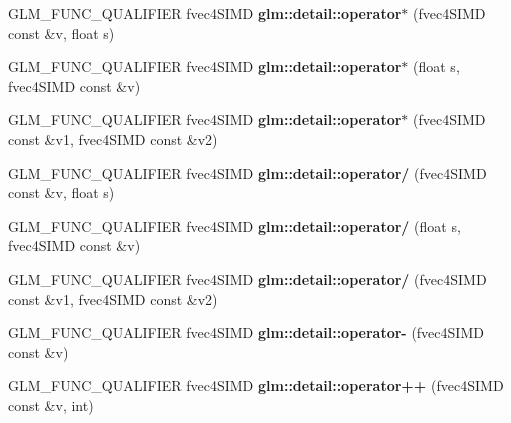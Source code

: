 \begin{DoxyCompactItemize}
\item 
\mbox{\label{simd__vec4_8inl_a640fd1bfb152eec121c97429854496cf}} 
G\+L\+M\+\_\+\+F\+U\+N\+C\+\_\+\+Q\+U\+A\+L\+I\+F\+I\+ER fvec4\+S\+I\+MD {\bfseries glm\+::detail\+::operator$\ast$} (fvec4\+S\+I\+MD const \&v, float s)
\item 
\mbox{\label{simd__vec4_8inl_a00cbd7d01eca0724ee68cdf04fa55d62}} 
G\+L\+M\+\_\+\+F\+U\+N\+C\+\_\+\+Q\+U\+A\+L\+I\+F\+I\+ER fvec4\+S\+I\+MD {\bfseries glm\+::detail\+::operator$\ast$} (float s, fvec4\+S\+I\+MD const \&v)
\item 
\mbox{\label{simd__vec4_8inl_ae683c4041ea23fddf34c36b87cbbd319}} 
G\+L\+M\+\_\+\+F\+U\+N\+C\+\_\+\+Q\+U\+A\+L\+I\+F\+I\+ER fvec4\+S\+I\+MD {\bfseries glm\+::detail\+::operator$\ast$} (fvec4\+S\+I\+MD const \&v1, fvec4\+S\+I\+MD const \&v2)
\item 
\mbox{\label{simd__vec4_8inl_af8a63b3b0eb2a7c3f59120bb4e160a76}} 
G\+L\+M\+\_\+\+F\+U\+N\+C\+\_\+\+Q\+U\+A\+L\+I\+F\+I\+ER fvec4\+S\+I\+MD {\bfseries glm\+::detail\+::operator/} (fvec4\+S\+I\+MD const \&v, float s)
\item 
\mbox{\label{simd__vec4_8inl_ac19446d5d6cc38cac352c5c6b802ab81}} 
G\+L\+M\+\_\+\+F\+U\+N\+C\+\_\+\+Q\+U\+A\+L\+I\+F\+I\+ER fvec4\+S\+I\+MD {\bfseries glm\+::detail\+::operator/} (float s, fvec4\+S\+I\+MD const \&v)
\item 
\mbox{\label{simd__vec4_8inl_aefac49f641fdbfa4140c9465cf30a625}} 
G\+L\+M\+\_\+\+F\+U\+N\+C\+\_\+\+Q\+U\+A\+L\+I\+F\+I\+ER fvec4\+S\+I\+MD {\bfseries glm\+::detail\+::operator/} (fvec4\+S\+I\+MD const \&v1, fvec4\+S\+I\+MD const \&v2)
\item 
\mbox{\label{simd__vec4_8inl_a0fd34f78cac49e112724c4fc71a4837c}} 
G\+L\+M\+\_\+\+F\+U\+N\+C\+\_\+\+Q\+U\+A\+L\+I\+F\+I\+ER fvec4\+S\+I\+MD {\bfseries glm\+::detail\+::operator-\/} (fvec4\+S\+I\+MD const \&v)
\item 
\mbox{\label{simd__vec4_8inl_a2434183491dc1c79ecd2860e789978f5}} 
G\+L\+M\+\_\+\+F\+U\+N\+C\+\_\+\+Q\+U\+A\+L\+I\+F\+I\+ER fvec4\+S\+I\+MD {\bfseries glm\+::detail\+::operator++} (fvec4\+S\+I\+MD const \&v, int)

\end{DoxyCompactItemize}
